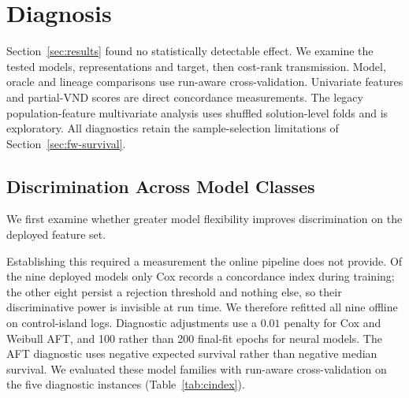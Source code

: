 \documentclass[a4paper,fleqn]{cas-dc}
\begin{document}
\section{Diagnosis}\label{sec:diagnosis}

Section~\ref{sec:results} found no statistically detectable effect. We examine
the tested models, representations and target, then cost-rank transmission.
Model, oracle and lineage comparisons use run-aware cross-validation.
Univariate features and partial-VND scores are direct concordance measurements.
The legacy population-feature multivariate analysis uses shuffled solution-level
folds and is exploratory. All diagnostics retain the sample-selection
limitations of Section~\ref{sec:fw-survival}.

\subsection{Discrimination Across Model Classes}\label{sec:diag-cindex}

We first examine whether greater model flexibility improves discrimination on
the deployed feature set.

Establishing this required a measurement the online pipeline does not provide.
Of the nine deployed models only Cox records a concordance index during
training; the other eight persist a rejection threshold and nothing else, so
their discriminative power is invisible at run time. We therefore refitted all
nine offline on control-island logs. Diagnostic adjustments use a $0.01$
penalty for Cox and Weibull AFT, and 100 rather than 200 final-fit epochs for
neural models. The AFT diagnostic uses negative expected survival rather than
negative median survival. We evaluated these model families with
run-aware cross-validation on the five diagnostic instances
(Table~\ref{tab:cindex}).
\end{document}
